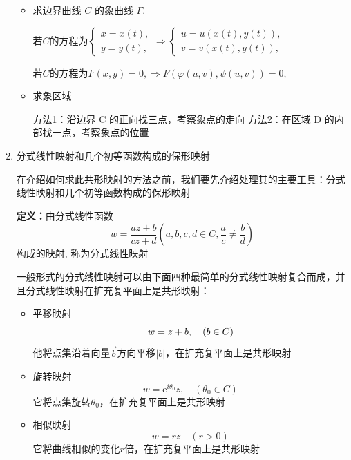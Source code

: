 \documentclass[a4paper,11pt,UTF8]{article}
\begin{document}
\begin{enumerate}
\begin{itemize}
		\item 求边界曲线 $C$ 的象曲线 $\Gamma.$
		
		若$C$的方程为$\begin{cases}{x}={x}(t),\\{y}={y}(t),\end{cases}\Rightarrow\begin{cases}u=u(x(t),y(t)),\\v=v(x(t),y(t)),\end{cases}$
		
		若$C$的方程为$ F(x,y)=0,\Rightarrow F(\varphi(u,v),\psi(u,v))=0,$
		
		\item 求象区域
		
		方法1：沿边界 C 的正向找三点，考察象点的走向
		方法2：在区域 D 的内部找一点，考察象点的位置
	\end{itemize}
	\item 分式线性映射和几个初等函数构成的保形映射
	
	在介绍如何求此共形映射的方法之前，我们要先介绍处理其的主要工具：分式线性映射和几个初等函数构成的保形映射 
	
	\textbf{定义：}由分式线性函数
	$$
		w=\frac{az+b}{cz+d}(a,b,c,d\in C,\frac ac\neq\frac bd)
	$$
	构成的映射, 称为分式线性映射
	
	一般形式的分式线性映射可以由下面四种最简单的分式线性映射复合而成，并且分式线性映射在扩充复平面上是共形映射：
	\begin{itemize}
		\item 平移映射
		$$
		w=z+b,\quad(b\in C)\\
		$$
		他将点集沿着向量$\vec{b}$方向平移$|b|$，在扩充复平面上是共形映射
		
		\item 旋转映射
		$$
		w=\mathrm{e}^{i\theta_0}z,\quad(\theta_0\in C)
		$$
		它将点集旋转$\theta_0$，在扩充复平面上是共形映射
		
		\item 相似映射
		$$
		w=rz\quad(r>0)
		$$
		它将曲线相似的变化$r$倍，在扩充复平面上是共形映射
		

\end{itemize}
\end{enumerate}
\end{document}
